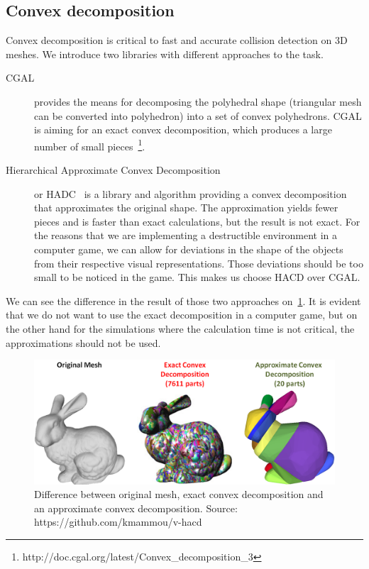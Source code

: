 \subsection{Convex decomposition}
\label{sec:decompositionLib}
Convex decomposition is critical to fast and accurate collision detection on 3D meshes. We introduce two libraries with different approaches to the task.
\begin{description}
\item[CGAL] provides the means for decomposing the polyhedral shape (triangular mesh can be converted into polyhedron) into a set of convex polyhedrons. CGAL is aiming for an exact convex decomposition, which produces a large number of small pieces~\footnote{http://doc.cgal.org/latest/Convex\_decomposition\_3}.

\item[Hierarchical Approximate Convex Decomposition] or HADC~\cite{HACD} is a library and algorithm providing a convex decomposition that approximates the original shape. The approximation yields fewer pieces and is faster than exact calculations, but the result is not exact. For the reasons that we are implementing a destructible environment in a computer game, we can allow for deviations in the shape of the objects from their respective visual representations. Those deviations should be too small to be noticed in the game. This makes us choose HACD over CGAL.
\end{description}


We can see the difference in the result of those two approaches on~\cref{fig:bunny}. It is evident that we do not want to use the exact decomposition in a computer game, but on the other hand for the simulations where the calculation time is not critical, the approximations should not be used.
\begin{figure}
        \centering
        \includegraphics[width=\textwidth]{img/bunny}
        \caption{Difference between original mesh, exact convex decomposition and an approximate convex decomposition. Source: https://github.com/kmammou/v-hacd}
        \label{fig:bunny}
\end{figure}


